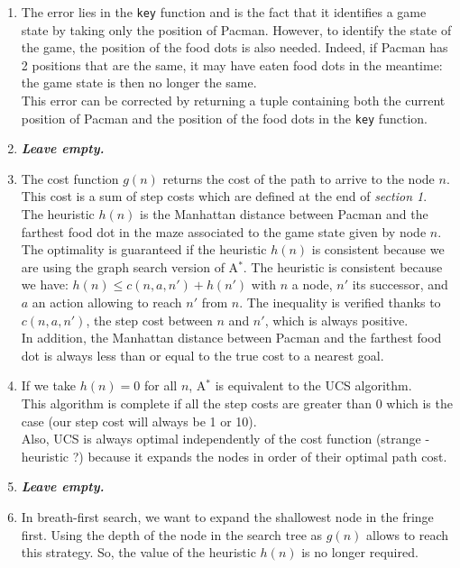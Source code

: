 \documentclass{article}
\begin{document}
\begin{enumerate}[label=\alph*.,leftmargin=1.35em]
    \item The error lies in the \texttt{key} function and is the fact that it identifies a game state by taking only the position of Pacman. However, to identify the state of the game, the position of the food dots is also needed. Indeed, if Pacman has 2 positions that are the same, it may have eaten food dots in the meantime: the game state is then no longer the same.\\
          This error can be corrected by returning a tuple containing both the current position of Pacman and the position of the food dots in the \texttt{key} function.  
    \item \textbf{{\it Leave empty.}}
    \item The cost function $g(n)$ returns the cost of the path to arrive to the node $n$. This cost is a sum of step costs which are defined at the end of \textit{section 1}.\\
    The heuristic $h(n)$ is the Manhattan distance between Pacman and the farthest food dot in the maze associated to the game state given by node $n$.\\
    The optimality is guaranteed if the heuristic $h(n)$ is consistent because we are using the graph search version of A$^*$. The heuristic is consistent because we have: $h(n) \leq c(n,a,n') + h(n')$ with $n$ a node, $n'$ its successor, and $a$ an action allowing to reach $n'$ from $n$. The inequality is verified thanks to $c(n,a,n')$, the step cost between $n$ and $n'$, which is always positive.\\
    In addition, the Manhattan distance between Pacman and the farthest food dot is always less than or equal to the true cost to a nearest goal.
    \item If we take $h(n) = 0$ for all $n$, A$^*$ is equivalent to the UCS algorithm.\\
    This algorithm is complete if all the step costs are greater than 0 which is the case (our step cost will always be 1 or 10).\\
    Also, UCS is always optimal independently of the cost function (strange - heuristic ?) because it expands the nodes in order of their optimal path cost.
    \item \textbf{{\it Leave empty.}}
    \item In breath-first search, we want to expand the shallowest node in the fringe first. Using the depth of the node in the search tree as $g(n)$ allows to reach this strategy. So, the value of the heuristic $h(n)$ is no longer required.
\end{enumerate}
\end{document}
